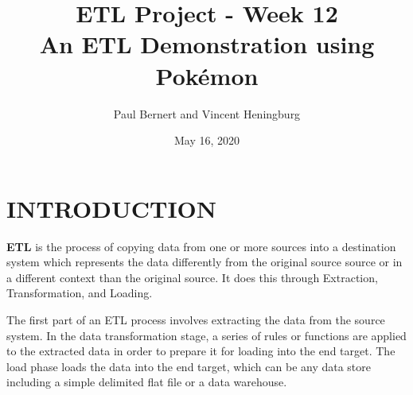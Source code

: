 \documentclass[10pt]{article}
\begin{document}
\setlength{\droptitle}{-4\baselineskip} %

\pretitle{\begin{center}\Huge\bfseries} %
\posttitle{\end{center}} %
\title{%
  ETL Project - Week 12 \\
  \large An ETL Demonstration using Pokémon} %
\author{Paul Bernert and Vincent Heningburg}
\date{May 16, 2020} %
\renewcommand{\maketitlehookd}{%
\vskip3mm
\renewcommand{\abstractname}{ABSTRACT}
\begin{abstract}
\vskip2mm
\noindent
This report aims to demonstrate the benefits of following the Extract, Transform and Load (ETL) processes of data warehousing through a basic example using information related to Pokémon and their moves. Using an external data-source from Kaggle, we explain each of the three steps to ETL and the logic/justifications for actions within each of those steps.
\end{abstract}
}
\maketitle


\section{INTRODUCTION}
\textbf{ETL} is the process of copying data from one or more sources into a destination system which represents the data differently from the original source source or in a different context than the original source. It does this through Extraction, Transformation, and Loading.

The first part of an ETL process involves extracting the data from the source system. In the data transformation stage, a series of rules or functions are applied to the extracted data in order to prepare it for loading into the end target. The load phase loads the data into the end target, which can be any data store including a simple delimited flat file or a data warehouse.
\end{document}
